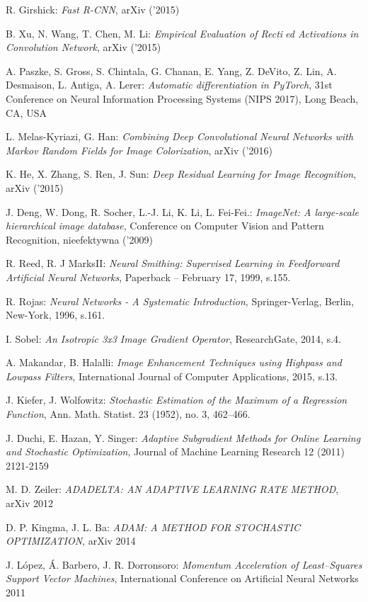 \begin{thebibliography}{99}
   R. Girshick:
  \emph{Fast R-CNN},
  arXiv ('2015)

   B. Xu, N. Wang, T. Chen, M. Li:
  \emph{Empirical Evaluation of Rectied Activations in Convolution Network},
   arXiv ('2015)

    A. Paszke, S. Gross, S. Chintala, G. Chanan,
   E. Yang, Z. DeVito, Z. Lin, A. Desmaison, L. Antiga, A. Lerer:
   \emph{Automatic differentiation in PyTorch}, 31st Conference on Neural Information
   Processing Systems (NIPS 2017), Long Beach, CA, USA

    L. Melas-Kyriazi, G. Han:
   \emph{Combining Deep Convolutional Neural Networks with Markov Random
   Fields for Image Colorization}, arXiv ('2016)

    K. He, X. Zhang, S. Ren, J. Sun:
   \emph{Deep Residual Learning for Image Recognition}, arXiv ('2015)

   J. Deng, W. Dong, R. Socher, L.-J. Li, K. Li, L. Fei-Fei.:
   \emph{ImageNet: A large-scale hierarchical image database}, Conference on Computer Vision and Pattern Recognition, nieefektywna ('2009)

    R. Reed,  R. J MarksII:
  \emph{Neural Smithing: Supervised Learning in Feedforward Artificial Neural Networks},
  Paperback – February 17, 1999, s.155.

   R. Rojas:
  \emph{Neural Networks - A Systematic Introduction},
  Springer-Verlag, Berlin, New-York, 1996, s.161.

   I. Sobel:
  \emph{An Isotropic 3x3 Image Gradient Operator},
  ResearchGate, 2014, s.4.

   A. Makandar, B. Halalli:
  \emph{Image Enhancement Techniques using Highpass and Lowpass Filters},
  International Journal of Computer Applications, 2015, s.13.

   J. Kiefer, J. Wolfowitz:
  \emph{Stochastic Estimation of the Maximum of a Regression Function},
  Ann. Math. Statist. 23 (1952), no. 3, 462--466.

   J. Duchi, E. Hazan, Y. Singer:
  \emph{Adaptive Subgradient Methods for Online Learning and Stochastic Optimization},
  Journal of Machine Learning Research 12 (2011) 2121-2159

   M. D. Zeiler:
  \emph{ADADELTA: AN ADAPTIVE LEARNING RATE METHOD},
  arXiv 2012

   D. P. Kingma, J. L. Ba:
  \emph{ADAM: A METHOD FOR STOCHASTIC OPTIMIZATION},
  arXiv 2014

   J. López, Á. Barbero, J. R. Dorronsoro:
  \emph{Momentum Acceleration of Least–Squares Support Vector Machines},
  International Conference on Artificial Neural Networks 2011

\end{thebibliography}
